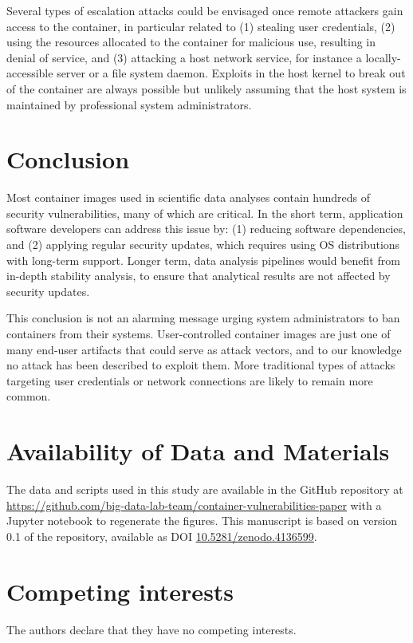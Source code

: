 \documentclass[a4paper,num-refs]{oup-contemporary}
\newcommand{\revision}[1]{\color{ao(english)}#1\color{black}\xspace}
\begin{document}
Several types of escalation attacks could be envisaged once remote
attackers gain access to the container, in particular related to \revision{(1) stealing user credentials}, (2) using
the resources allocated to the container for malicious use, resulting in denial of service, and
(3) attacking a host network service, for instance \revision{a locally-accessible server} or a file
system daemon. Exploits in the host kernel to break out of the container
are always possible but unlikely assuming that the host system is
maintained by professional system administrators.

\section{Conclusion}

Most container images \revision{used in} scientific data analyses
contain hundreds of security vulnerabilities, many of which are critical.
In the short term, application software developers can address this issue
by: (1) reducing software dependencies, and (2) applying regular security
updates, which requires using OS distributions with long-term support.
Longer term, data analysis pipelines would benefit from in-depth stability
analysis, to ensure that analytical results are not affected by security
updates.

This conclusion is not an alarming message urging \revision{system} administrators  
to ban containers from their systems. User-controlled container images are
just one of many end-user artifacts that could serve as attack vectors, and
to our knowledge no attack has been described to exploit them. More
traditional types of attacks targeting user credentials or network
connections are likely to remain more common.

\section{Availability of Data and Materials}

The data and scripts used in this study are available in the GitHub repository at
\url{https://github.com/big-data-lab-team/container-vulnerabilities-paper}
with a Jupyter notebook to regenerate the figures. This manuscript is based on 
version 0.1 of the repository, available as DOI \href{https://doi.org/10.5281/zenodo.4136599}{10.5281/zenodo.4136599}.


\section{Competing interests}

The authors declare that they have no competing interests.


\end{document}
